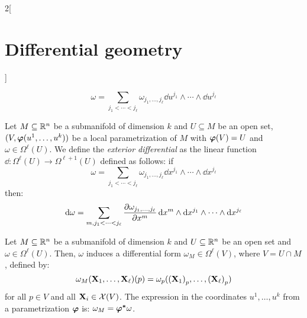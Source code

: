 \documentclass[../../../main.tex]{subfiles}
\begin{document}
\begin{multicols}{2}[\section{Differential geometry}]
\begin{definition}
    $$\omega=\sum_{j_1<\cdots<j_\ell}\omega_{j_1,\ldots,j_\ell}\dd{u^{j_1}}\wedge\cdots\wedge\dd{u^{j_\ell}}$$
  \end{definition}
  \begin{definition}
    Let $M\subseteq\mathbb{R}^n$ be a submanifold of dimension $k$ and $U\subseteq M$ be an open set, $(V,\boldsymbol{\mathrm{\varphi}}(u^1,\ldots,u^k))$ be a local parametrization of $M$ with $\boldsymbol{\mathrm{\varphi}}(V)=U$ and $\omega\in\Omega^\ell(U)$. We define the \emph{exterior differential} as the linear function $\dd:\Omega^\ell(U)\rightarrow\Omega^{\ell+1}(U)$ defined as follows: if $$\omega=\sum_{j_1<\cdots<j_\ell}\omega_{j_1,\ldots,j_\ell}\dd{x^{j_1}}\wedge\cdots\wedge\dd{x^{j_\ell}}$$
    then: $$\dd{\omega}=\sum_{m,j_1<\cdots<j_\ell}\pdv{\omega_{j_1,\ldots,j_\ell}}{x^m}\dd{x^m}\wedge\dd{x^{j_1}}\wedge\cdots\wedge\dd{x^{j_\ell}}$$
  \end{definition}
  \begin{proposition}
    Let $M\subseteq\mathbb{R}^n$ be a submanifold of dimension $k$ and $U\subseteq \mathbb{R}^n$ be an open set and $\omega\in\Omega^\ell(U)$. Then, $\omega$ induces a differential form $\omega_M\in\Omega^\ell(V)$, where $V=U\cap M$, defined by: $$\omega_M(\boldsymbol{\mathrm{X}}_1,\ldots,\boldsymbol{\mathrm{X}}_\ell)(p)=\omega_p({(\boldsymbol{\mathrm{X}}_1)}_p,\ldots,{(\boldsymbol{\mathrm{X}}_\ell)}_p)$$
    for all $p\in V$ and all $\boldsymbol{\mathrm{X}}_i\in\mathcal{X}(V)$.
    The expression in the coordinates $u^1,\ldots,u^k$ from a parametrization $\boldsymbol{\mathrm{\varphi}}$ is: $\omega_M=\boldsymbol{\mathrm{\varphi^*}}\omega$.
  \end{proposition}

\end{multicols}
\end{document}
